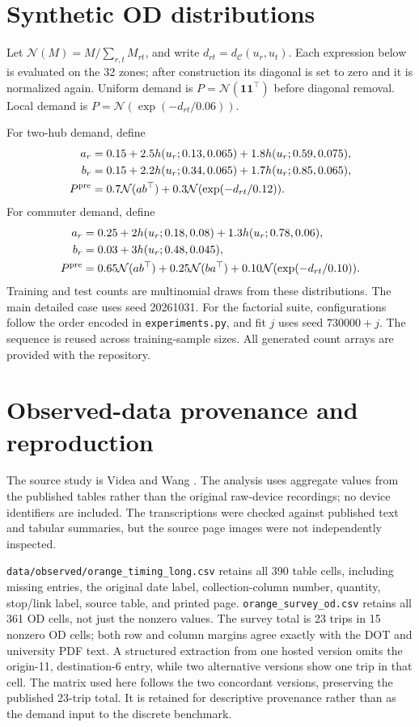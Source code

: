 \documentclass[11pt]{article}
\theoremstyle{remark}\newtheorem{remark}[theorem]{Remark}
\newcommand{\C}{\mathcal C}
\begin{document}
\appendix
\section{Synthetic OD distributions}\label{app:demand}
Let $\mathcal N(M)=M/\sum_{r,t}M_{rt}$, and write $d_{rt}=d_\C(u_r,u_t)$. Each expression below is evaluated on the 32 zones; after construction its diagonal is set to zero and it is normalized again. Uniform demand is $P=\mathcal N(\mathbf1\mathbf1^\top)$ before diagonal removal. Local demand is $P=\mathcal N(\exp(-d_{rt}/0.06))$.

For two-hub demand, define
\begin{align*}
a_r&=0.15+2.5h(u_r;0.13,0.065)+1.8h(u_r;0.59,0.075),\\
b_r&=0.15+2.2h(u_r;0.34,0.065)+1.7h(u_r;0.85,0.065),\\
P^{\rm pre}&=0.7\mathcal N(ab^\top)+0.3\mathcal N(\exp(-d_{rt}/0.12)).
\end{align*}
For commuter demand, define
\begin{align*}
a_r&=0.25+2h(u_r;0.18,0.08)+1.3h(u_r;0.78,0.06),\\
b_r&=0.03+3h(u_r;0.48,0.045),\\
P^{\rm pre}&=0.65\mathcal N(ab^\top)+0.25\mathcal N(ba^\top)
+0.10\mathcal N(\exp(-d_{rt}/0.10)).
\end{align*}
Training and test counts are multinomial draws from these distributions. The main detailed case uses seed 20261031. For the factorial suite, configurations follow the order encoded in \texttt{experiments.py}, and fit $j$ uses seed $730000+j$. The sequence is reused across training-sample sizes. All generated count arrays are provided with the repository.

\section{Observed-data provenance and reproduction}\label{app:observed}
The source study is Videa and Wang \cite{videa}. The analysis uses aggregate values from the published tables rather than the original raw-device recordings; no device identifiers are included. The transcriptions were checked against published text and tabular summaries, but the source page images were not independently inspected.

\texttt{data/observed/orange\_timing\_long.csv} retains all 390 table cells, including missing entries, the original date label, collection-column number, quantity, stop/link label, source table, and printed page. \texttt{orange\_survey\_od.csv} retains all 361 OD cells, not just the nonzero values. The survey total is 23 trips in 15 nonzero OD cells; both row and column margins agree exactly with the DOT and university PDF text. A structured extraction from one hosted version omits the origin-11, destination-6 entry, while two alternative versions show one trip in that cell. The matrix used here follows the two concordant versions, preserving the published 23-trip total. It is retained for descriptive provenance rather than as the demand input to the discrete benchmark.
\end{document}
